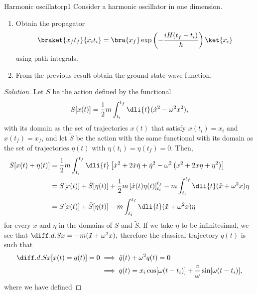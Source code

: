 \begin{problem}{Harmonic oscillator}{p1}
   Consider a harmonic oscillator in one dimension.
   \begin{enumerate}[label=(\alph*)]
      \item Obtain the propagator 
         \begin{equation*}
            \braket{x_ft_f}{x_it_i} = \bra{x_f}\exp\left(-\frac{iH(t_f - t_i)}{\hbar}\right)\ket{x_i}
         \end{equation*}
         using path integrals.
      \item From the previous result obtain the ground state wave function.
   \end{enumerate}
\end{problem}
\begin{proof}[Solution]
   Let \(S\) be the action defined by the functional
   \begin{equation*}
      S[x(t)] = \frac12 m \int_{t_i}^{t_f} \dli{t} (\dot{x}^2 - \omega^2 x^2),
   \end{equation*}
   with its domain as the set of trajectories \(x(t)\) that satisfy \(x(t_i) = x_i\) and \(x(t_f) = x_f\), and let \(\tilde{S}\) be the action with the same functional with its domain as the set of trajectories \(\eta(t)\) with \(\eta(t_i) = \eta(t_f) = 0.\) Then,
   \begin{align*}
      S[x(t) + \eta(t)]
      &= \frac12 m\int_{t_i}^{t_f} \dli{t} \left[ \dot{x}^2 + 2\dot{x} \dot{\eta} + \dot{\eta}^2 - \omega^2 \left(x^2 + 2x\eta + \eta^2\right)\right]\\
      &= S[x(t)] + \tilde{S}[\eta(t)] + \frac12 m \left[\dot{x}(t) \eta(t)\right]_{t_i}^{t_f} - m \int_{t_i}^{t_f} \dli{t} (\ddot{x} + \omega^2 x) \eta\\
      &= S[x(t)] + \tilde{S}[\eta(t)] - m \int_{t_i}^{t_f} \dli{t} (\ddot{x} + \omega^2 x) \eta
   \end{align*}
   for every \(x\) and \(\eta\) in the domains of \(S\) and \(\tilde{S}\). If we take \(\eta\) to be infinitesimal, we see that \(\diff.d.{S}{x} = -m(\ddot{x} + \omega^2 x),\) therefore the classical trajectory \(q(t)\) is such that 
   \begin{align*}
      \diff.d.{S}{x}[x(t) = q(t)] = 0 &\implies \ddot{q}(t) + \omega^2 q(t) = 0\\
                                      &\implies q(t) = x_i \cos[\omega (t - t_i)] + \frac{v}{\omega} \sin[\omega (t - t_i)],
   \end{align*}
   where we have defined

\end{proof}
